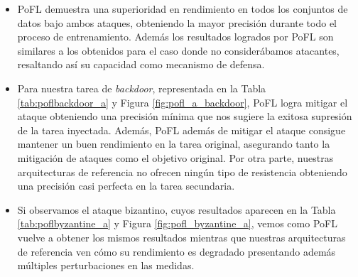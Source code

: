 \begin{itemize}
	\item \ac{PoFL} demuestra una superioridad en rendimiento en todos los conjuntos de datos bajo ambos ataques, obteniendo la mayor precisión durante todo el proceso de entrenamiento. Además los resultados logrados por \ac{PoFL} son similares a los obtenidos para el caso donde no considerábamos atacantes, resaltando así su capacidad como mecanismo de defensa.

    \item Para nuestra tarea de \textit{backdoor}, representada en la Tabla \ref{tab:poflbackdoor_a} y Figura \ref{fig:pofl_a_backdoor}, \ac{PoFL} logra mitigar el ataque obteniendo una precisión mínima que nos sugiere la exitosa supresión de la tarea inyectada. Además, \ac{PoFL} además de mitigar el ataque consigue mantener un buen rendimiento en la tarea original, asegurando tanto la mitigación de ataques como el objetivo original. Por otra parte, nuestras arquitecturas de referencia no ofrecen ningún tipo de resistencia obteniendo una precisión casi perfecta en la tarea secundaria.

    \item Si observamos el ataque bizantino, cuyos resultados aparecen en la Tabla \ref{tab:poflbyzantine_a} y Figura \ref{fig:pofl_byzantine_a}, vemos como \ac{PoFL} vuelve a obtener los mismos resultados mientras que nuestras arquitecturas de referencia ven cómo su rendimiento es degradado presentando además múltiples perturbaciones en las medidas.
\end{itemize}

